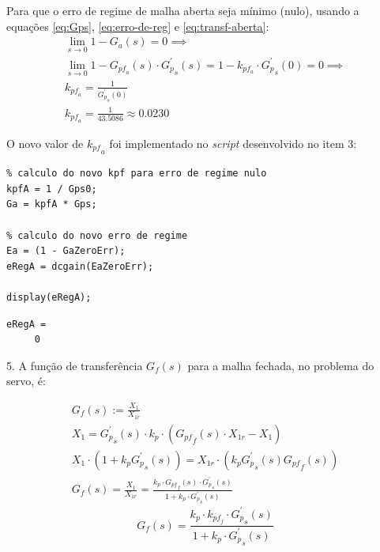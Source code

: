 \documentclass[a4paper,11pt]{article}
\begin{document}
% 

Para que o erro de regime de malha aberta seja mínimo (nulo), usando a
equações \ref{eq:Gps}, \ref{eq:erro-de-reg} e \ref{eq:transf-aberta}:
\begin{gather*}
    \lim_{s\to0} 1 - G_a\left(s\right) = 0 \implies \\
    \lim_{s\to0} 1 - G_{{pf}_a}\left(s\right) \cdot
        {G^\prime_p}_s\left(s\right) =
        1 - k_{pf_a} \cdot {G^\prime_p}_s\left(0\right) = 0 \implies \\
    k_{{pf}_a} = \frac{1}{{G^\prime_p}_s\left(0\right)} \\
    k_{{pf}_a} = \frac{1}{43.5086} \approx 0.0230
\end{gather*}

O novo valor de ${k_{pf}}_a$ foi implementado no \textit{script} desenvolvido no
item 3:

\begin{lstlisting}
% calculo do novo kpf para erro de regime nulo
kpfA = 1 / Gps0;
Ga = kpfA * Gps;

% calculo do novo erro de regime
Ea = (1 - GaZeroErr);
eRegA = dcgain(EaZeroErr);

display(eRegA);
\end{lstlisting}
\begin{lstlisting}
eRegA =
     0
\end{lstlisting}

5. A função de transferência $G_f\left(s\right)$ para a malha fechada, no
problema do servo, é:

\begin{gather*}
    G_f\left(s\right) := \frac{X_1}{X_{1r}} \\
    X_1 = {G^\prime_p}_s\left(s\right) \cdot k_p \cdot
        \left({G_{pf}}_f\left(s\right) \cdot X_{1r} - X_1\right) \\
    X_1 \cdot \left(1 + k_p {G^\prime_p}_s\left(s\right) \right) =
        X_{1r} \cdot \left( k_p {G^\prime_p}_s\left(s\right)
        {G_{pf}}_f\left(s\right) \right) \\
    G_f\left(s\right) = \frac{X_1}{X_{1r}} =
        \frac{k_p \cdot {G_{pf}}_f\left(s\right) \cdot
        {G^\prime_p}_s\left(s\right)}{1 + k_p \cdot
        {G^\prime_p}_s\left(s\right)}
\end{gather*}
\begin{equation}
    \label{eq:transf-fechada}
    G_f\left(s\right) =
        \frac{k_p \cdot k_{{pf}_f} \cdot {G^\prime_p}_s\left(s\right)}
        {1 + k_p \cdot {G^\prime_p}_s\left(s\right)}
\end{equation}
\end{document}
